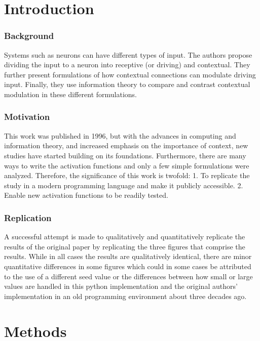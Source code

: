 \section{Introduction}


\subsubsection{Background}
Systems such as neurons can have different types of input. The authors\supercite{Smyth:1996} propose dividing the input to a neuron into receptive (or driving) and contextual. They further present formulations of how contextual connections can modulate driving input. Finally, they use information theory to compare and contrast contextual modulation in these different formulations.

\subsubsection{Motivation}
This work was published in 1996, but with the advances in computing and information theory, and increased emphasis on the importance of context\supercite{Larkum:2013}, new studies\supercite{Kay:2011,Wibral:2017} have started building on its foundations. Furthermore, there are many ways to write the activation functions and only a few simple formulations were analyzed. Therefore, the significance of this work is twofold: 1. To replicate the study in a modern programming language and make it publicly accessible.   2. Enable new activation functions to be readily tested.

\subsubsection{Replication}
A successful attempt is made to qualitatively and quantitatively replicate the results of the original paper by replicating the three figures that comprise the results. While in all cases the results are qualitatively identical, there are minor quantitative differences in some figures which could in some cases be attributed to the use of a different seed value or the differences between how small or large values are handled in this python implementation and the original authors' implementation in an old programming environment about three decades ago. 

\section{Methods}


